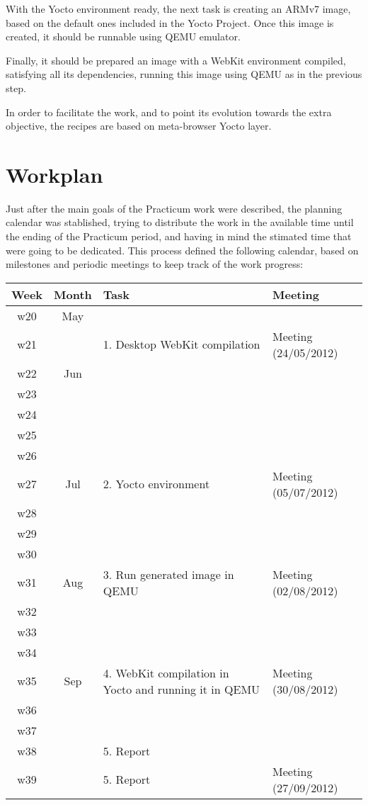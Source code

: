 \documentclass[a4paper,11pt,openany]{report}
\begin{document}
With the Yocto environment ready, the next task is creating an ARMv7 image, based on the default ones included in the Yocto Project. Once this image is created, it should be runnable using QEMU emulator.

Finally, it should be prepared an image with a WebKit environment compiled, satisfying all its dependencies, running this image using QEMU as in the previous step.

In order to facilitate the work, and to point its evolution towards the extra objective, the recipes are based on meta-browser Yocto layer.

\section{Workplan}
Just after the main goals of the Practicum work were described, the planning calendar was stablished, trying to distribute the work in the available time until the ending of the Practicum period, and having in mind the stimated time that were going to be dedicated.
This process defined the following calendar, based on milestones and periodic meetings to keep track of the work progress:
\\
\begin{tabularx}{\textwidth}{|c|c|X|X|}
\hline 
Week & Month & Task & Meeting \\ 
\hline 
w20 & May &  &  \\ 
\hline 
w21 &  & 1. Desktop WebKit compilation & Meeting (24/05/2012) \\ 
\hline 
w22 & Jun &  &  \\ 
\hline 
w23 &  &  &  \\ 
\hline 
w24 &  &  &  \\ 
\hline 
w25 &  &  &  \\ 
\hline 
w26 &  &  &  \\ 
\hline 
w27 & Jul & 2. Yocto environment & Meeting (05/07/2012) \\ 
\hline 
w28 &  &  &  \\ 
\hline 
w29 &  &  &  \\ 
\hline 
w30 &  &  &  \\ 
\hline 
w31 & Aug & 3. Run generated image in QEMU & Meeting (02/08/2012) \\ 
\hline 
w32 &  &  &  \\ 
\hline 
w33 &  &  &  \\ 
\hline 
w34 &  &  &  \\ 
\hline 
w35 & Sep & 4. WebKit compilation in Yocto and running it in QEMU & Meeting (30/08/2012) \\ 
\hline 
w36 &  &  &  \\ 
\hline 
w37 &  &  &  \\ 
\hline 
w38 &  & 5. Report &  \\ 
\hline 
w39 &  & 5. Report & Meeting (27/09/2012) \\ 
\hline \end{tabularx}
\end{document}
